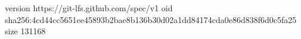 version https://git-lfs.github.com/spec/v1
oid sha256:4cd44cc5651ee45893b2bae8b136b30d02a1dd84174cda0e86d838f6d0c5fa25
size 131168
